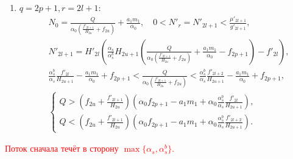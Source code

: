 \begin{enumerate}[leftmargin=10pt,itemindent=26pt]
    \item \(q=2p+1, r=2l+1\):
    \begin{align*}
        & N_0 = \frac{Q}{\alpha_0 \left( \frac{f'_{2l+1}}{H_{2u}} + f_{2u} \right)} + \frac{a_1 m_1}{\alpha_0}, \quad 0 < N'_r = N'_{2l+1} < \frac{\mu'_{2l+1}}{g'_{2l+1}}, \\
        & N'_{2l+1} = H'_{2l} \left( \frac{\alpha_s}{\alpha^b_s} H_{2u+1} \left( \frac{Q}{\alpha_0 \left( \frac{f'_{2l+1}}{H_{2u}} + f_{2u} \right)} + \frac{a_1 m_1}{\alpha_0} - f_{2p+1} \right) - f'_{2l} \right), \\
        & \frac{\alpha^b_s}{\alpha_s} \frac{f'_{2l}}{H_{2u+1}} - \frac{a_1 m_1}{\alpha_0} + f_{2p+1} < \frac{Q}{\alpha_0 \left( \frac{f'_{2l+1}}{H_{2u}} + f_{2u} \right)} < \frac{\alpha^b_s}{\alpha_s} \frac{f'_{2l+2}}{H_{2u+1}} - \frac{a_1 m_1}{\alpha_0} + f_{2p+1}, \\
        & \begin{cases}
            Q > \left( f_{2u} + \frac{f'_{2l+1}}{H_{2u}} \right) \left( \alpha_0 f_{2p+1} - a_1 m_1 + \alpha_0 \frac{\alpha^b_s}{\alpha_s} \frac{f'_{2l}}{H_{2u+1}} \right), \\
            Q < \left( f_{2u} + \frac{f'_{2l+1}}{H_{2u}} \right) \left( \alpha_0 f_{2p+1} - a_1 m_1 + \alpha_0 \frac{\alpha^b_s}{\alpha_s} \frac{f'_{2l+2}}{H_{2u+1}} \right).
        \end{cases}
    \end{align*}
\end{enumerate}


\textcolor{red}{Поток сначала течёт в сторону \(\max \{ \alpha_s, \alpha^b_s \}\).}